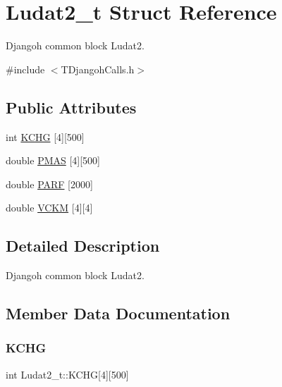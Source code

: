 \hypertarget{struct_ludat2__t}{}\section{Ludat2\+\_\+t Struct Reference}
\label{struct_ludat2__t}


Djangoh common block Ludat2.  




{\ttfamily \#include $<$T\+Djangoh\+Calls.\+h$>$}

\subsection*{Public Attributes}
\begin{DoxyCompactItemize}
\item 
int \hyperlink{struct_ludat2__t_ae7ac5c356f6954159345aa9043cde094}{K\+C\+HG} \mbox{[}4\mbox{]}\mbox{[}500\mbox{]}
\item 
double \hyperlink{struct_ludat2__t_a3ba40c50d21f9c3e2a9f27a1630e9199}{P\+M\+AS} \mbox{[}4\mbox{]}\mbox{[}500\mbox{]}
\item 
double \hyperlink{struct_ludat2__t_a1691485f7138c4707132de64991719e5}{P\+A\+RF} \mbox{[}2000\mbox{]}
\item 
double \hyperlink{struct_ludat2__t_a20d157be63ce36f91641642e81bb7334}{V\+C\+KM} \mbox{[}4\mbox{]}\mbox{[}4\mbox{]}
\end{DoxyCompactItemize}


\subsection{Detailed Description}
Djangoh common block Ludat2. 

\subsection{Member Data Documentation}
\mbox{\label{struct_ludat2__t_ae7ac5c356f6954159345aa9043cde094}} 
\subsubsection{\texorpdfstring{K\+C\+HG}{KCHG}}
{\footnotesize\ttfamily int Ludat2\+\_\+t\+::\+K\+C\+HG\mbox{[}4\mbox{]}\mbox{[}500\mbox{]}}

\mbox{\label{struct_ludat2__t_a1691485f7138c4707132de64991719e5}} 
